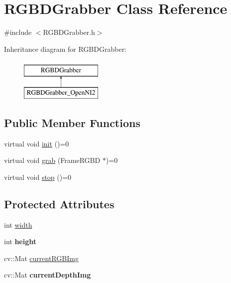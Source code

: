 \hypertarget{classRGBDGrabber}{\section{R\-G\-B\-D\-Grabber Class Reference}
\label{classRGBDGrabber}
}


{\ttfamily \#include $<$R\-G\-B\-D\-Grabber.\-h$>$}

Inheritance diagram for R\-G\-B\-D\-Grabber\-:\begin{figure}[H]
\begin{center}
\leavevmode
\includegraphics[height=2.000000cm]{classRGBDGrabber}
\end{center}
\end{figure}
\subsection*{Public Member Functions}
\begin{DoxyCompactItemize}
\item 
virtual void \hyperlink{classRGBDGrabber_ad4f514ef7ef4cb30f88691576cd2a415}{init} ()=0
\item 
virtual void \hyperlink{classRGBDGrabber_a5421d2f64b001189aaddb517bd50f973}{grab} (Frame\-R\-G\-B\-D $\ast$)=0
\item 
virtual void \hyperlink{classRGBDGrabber_aa835859ea230e1ca302adaa4cb054207}{stop} ()=0
\end{DoxyCompactItemize}
\subsection*{Protected Attributes}
\begin{DoxyCompactItemize}
\item 
int \hyperlink{classRGBDGrabber_aafd74a114077376b2326476e1b65ce20}{width}
\item 
\hypertarget{classRGBDGrabber_a5b03f2b35c58d70db79db90728558f7f}{int {\bfseries height}}\label{classRGBDGrabber_a5b03f2b35c58d70db79db90728558f7f}

\item 
cv\-::\-Mat \hyperlink{classRGBDGrabber_a077f46c80736207093874e307e53b269}{current\-R\-G\-B\-Img}
\item 
\hypertarget{classRGBDGrabber_a942fbb8ab02ac4d30fef4dadd20a0e7c}{cv\-::\-Mat {\bfseries current\-Depth\-Img}}\label{classRGBDGrabber_a942fbb8ab02ac4d30fef4dadd20a0e7c}

\end{DoxyCompactItemize}


